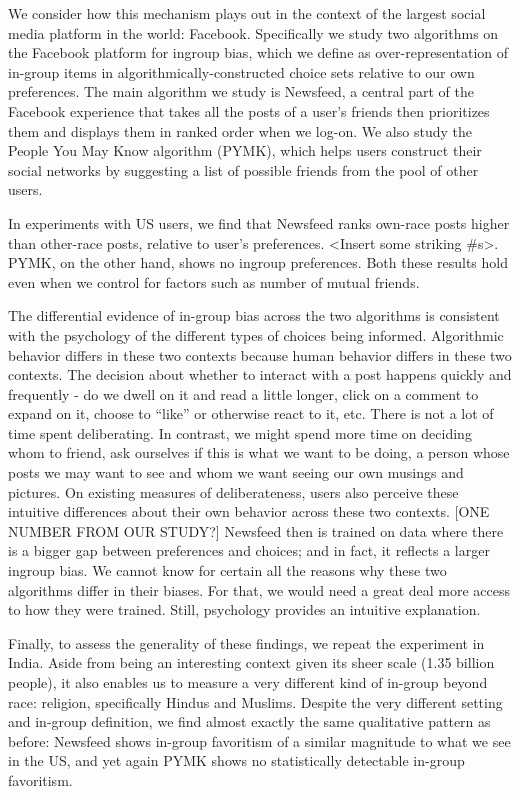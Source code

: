 \documentclass[12pt,letterpaper]{article}
\begin{document}
We consider how this mechanism plays out in the context of the largest social media platform in the world: Facebook. Specifically we study two algorithms on the Facebook platform for ingroup bias, which we define as over-representation of in-group items in algorithmically-constructed choice sets relative to our own preferences. The main algorithm we study is Newsfeed, a central part of the Facebook experience that takes all the posts of a user's friends then prioritizes them and displays them in ranked order when we log-on. We also study the People You May Know algorithm (PYMK), which helps users construct their social networks by suggesting a list of possible friends from the pool of other users. 

In experiments with US users, we find that Newsfeed ranks own-race posts higher than other-race posts, relative to user's preferences. <Insert some striking #s>. PYMK, on the other hand, shows no ingroup preferences. Both these results hold even when we control for factors such as number of mutual friends. 

The differential evidence of in-group bias across the two algorithms is consistent with the psychology of the different types of choices being informed. Algorithmic behavior differs in these two contexts because human behavior differs in these two contexts. The decision about whether to interact with a post happens quickly and frequently - do we dwell on it and read a little longer, click on a comment to expand on it, choose to ``like'' or otherwise react to it, etc. There is not a lot of time spent deliberating. In contrast, we might spend more time on deciding whom to friend, ask ourselves if this is what we want to be doing, a person whose posts we may want to see and whom we want seeing our own musings and pictures. On existing measures of deliberateness, users also perceive these intuitive differences about their own behavior across these two contexts. [ONE NUMBER FROM OUR STUDY?] Newsfeed then is trained on data where there is a bigger gap between preferences and choices; and in fact, it reflects a larger ingroup bias. We cannot know for certain all the reasons why these two algorithms differ in their biases. For that, we would need a great deal more access to how they were trained. Still, psychology provides an intuitive explanation. 

Finally, to assess the generality of these findings, we repeat the experiment in India. Aside from being an interesting context given its sheer scale (1.35 billion people), it also enables us to measure a very different kind of in-group beyond race: religion, specifically Hindus and Muslims. Despite the very different setting and in-group definition, we find almost exactly the same qualitative pattern as before: Newsfeed shows in-group favoritism of a similar magnitude to what we see in the US, and yet again PYMK shows no statistically detectable in-group favoritism. 
\end{document}
